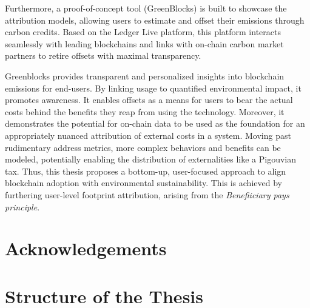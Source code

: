 \documentclass[11pt]{report}
\begin{document}
Furthermore, a proof-of-concept tool (GreenBlocks) is built to showcase the attribution models, allowing users to estimate and offset their emissions through carbon credits. Based on the Ledger Live platform, this platform interacts seamlessly with leading blockchains and links with on-chain carbon market partners to retire offsets with maximal transparency.

Greenblocks provides transparent and personalized insights into blockchain emissions for end-users. By linking usage to quantified environmental impact, it promotes awareness. It enables offsets as a means for users to bear the actual costs behind the benefits they reap from using the technology. Moreover, it demonstrates the potential for on-chain data to be used as the foundation for an appropriately nuanced attribution of external costs in a system. Moving past rudimentary address metrics, more complex behaviors and benefits can be modeled, potentially enabling the distribution of externalities like a Pigouvian tax. Thus, this thesis proposes a bottom-up, user-focused approach to align blockchain adoption with environmental sustainability. This is achieved by furthering user-level footprint attribution, arising from the \textit{Benefiiciary pays principle}.


\newpage
\section*{Acknowledgements}
\tableofcontents



\newpage

\section*{Structure of the Thesis}
\end{document}

